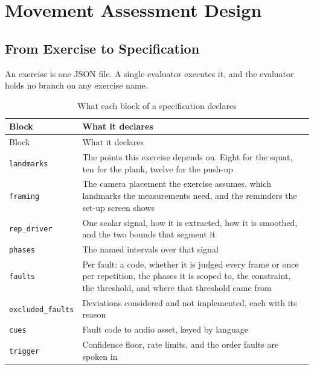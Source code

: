 \chapter{Movement Assessment Design}
\label{chap:6}

\section{From Exercise to Specification}
\label{sec:6.1}

An exercise is one JSON file. A single evaluator executes it, and the evaluator holds no branch on any exercise name.

{\small
\setlength{\LTpre}{6pt}\setlength{\LTpost}{8pt}
\begin{longtable}{>{\raggedright\arraybackslash}p{}>{\raggedright\arraybackslash}p{}}
\caption{What each block of a specification declares}\\
\toprule
Block & What it declares \\
\midrule
\endfirsthead
\toprule
Block & What it declares \\
\midrule
\endhead
\bottomrule
\endfoot
\bottomrule
\endlastfoot
\texttt{landmarks} & The points this exercise depends on. Eight for the squat, ten for the plank, twelve for the push-up \\
\texttt{framing} & The camera placement the exercise assumes, which landmarks the measurements need, and the reminders the set-up screen shows \\
\texttt{rep\_\allowbreak{}driver} & One scalar signal, how it is extracted, how it is smoothed, and the two bounds that segment it \\
\texttt{phases} & The named intervals over that signal \\
\texttt{faults} & Per fault: a code, whether it is judged every frame or once per repetition, the phases it is scoped to, the constraint, the threshold, and where that threshold came from \\
\texttt{excluded\_\allowbreak{}faults} & Deviations considered and not implemented, each with its reason \\
\texttt{cues} & Fault code to audio asset, keyed by language \\
\texttt{trigger} & Confidence floor, rate limits, and the order faults are spoken in \\
\end{longtable}
}

